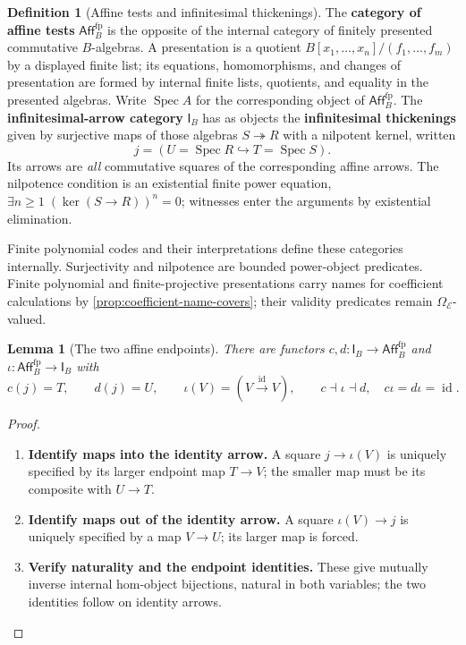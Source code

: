 \documentclass[11pt,a4paper]{article}
\numberwithin{algorithm}{section}
\numberwithin{equation}{section}
\newtheorem{lemma}[lemma]{Lemma}
\theoremstyle{definition}
\newtheorem{definition}[definition]{Definition}
\theoremstyle{remark}
\theoremstyle{plain}
\newcommand{\E}{\mathcal E}
\newcommand{\Truth}{\Omega_{\E}}
\newcommand{\id}{\operatorname{id}}
\newcommand{\AffB}{\mathsf{Aff}^{\mathrm{fp}}_B}
\newcommand{\InfB}{\mathsf I_B}
\theoremstyle{definition}
\theoremstyle{plain}
\begin{document}
\begin{definition}[Affine tests and infinitesimal thickenings]\label{def:infinitesimal-arrow-category}
The \textbf{category of affine tests} $\AffB$ is the opposite of the internal category of finitely
presented commutative $B$-algebras.  A presentation is a quotient
$B[x_1,\ldots,x_n]/(f_1,\ldots,f_m)$ by a displayed finite list;
its equations, homomorphisms, and changes of presentation are
formed by internal finite lists, quotients, and equality in the presented algebras.
Write $\operatorname{Spec}A$ for the corresponding object of $\AffB$.
The \textbf{infinitesimal-arrow category} $\InfB$ has as objects the
\textbf{infinitesimal thickenings} given by surjective
maps of those algebras $S\twoheadrightarrow R$ with a nilpotent
kernel, written
\[
 j=(U=\operatorname{Spec}R\hookrightarrow
       T=\operatorname{Spec}S).
\]
Its arrows are \emph{all} commutative squares of the corresponding
affine arrows.  The nilpotence condition is an existential finite
power equation, $\exists n\ge1\;(\ker(S\to R))^n=0$; witnesses enter the arguments by existential elimination.
\end{definition}

Finite polynomial codes and their interpretations define these
categories internally. Surjectivity and nilpotence are bounded
power-object predicates. Finite polynomial and finite-projective
presentations carry names for coefficient calculations by
\cref{prop:coefficient-name-covers}; their validity predicates
remain $\Truth$-valued.

\begin{lemma}[The two affine endpoints]\label{lem:infinitesimal-endpoints}
There are functors $c,d:\InfB\to\AffB$ and
$\iota:\AffB\to\InfB$ with
\[
 c(j)=T,\qquad d(j)=U,\qquad
 \iota(V)=(V\xrightarrow{\id}V),
 \qquad c\dashv\iota\dashv d,\quad c\iota=d\iota=\id.
\]
\end{lemma}
\begin{proof}\leavevmode
\begin{enumerate}[leftmargin=*,align=left]
\item \textbf{Identify maps into the identity arrow.}
A square $j\to\iota(V)$ is uniquely specified by its larger
endpoint map $T\to V$; the smaller map must be its composite with
$U\to T$.

\item \textbf{Identify maps out of the identity arrow.}
A square $\iota(V)\to j$ is uniquely specified by a
map $V\to U$; its larger map is forced.

\item \textbf{Verify naturality and the endpoint identities.}
These give mutually
inverse internal hom-object bijections, natural in both variables;
the two identities follow on identity arrows.
\end{enumerate}
\end{proof}
\end{document}
